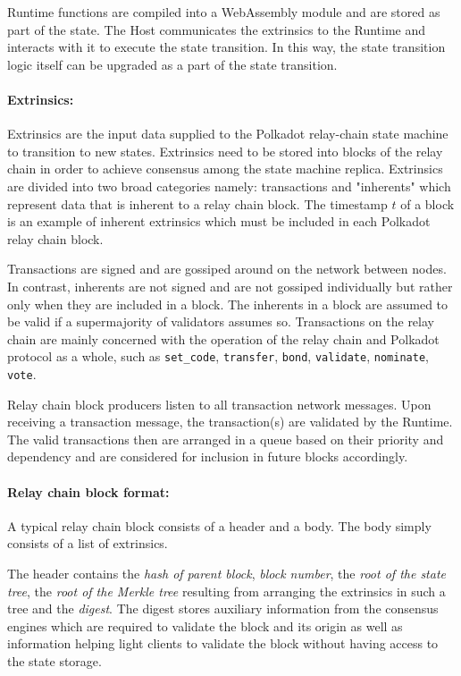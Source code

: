 Runtime functions are compiled into a WebAssembly module and are stored as part of the state. The Host communicates the extrinsics to the Runtime and interacts with it to execute the state transition. In this way, the state transition logic itself can be upgraded as a part of the state transition.

\paragraph{Extrinsics:} \label{par:extrinsics}

Extrinsics are the input data supplied to the Polkadot relay-chain state machine to transition to new states. Extrinsics need to be stored into blocks of the relay chain in order to achieve consensus among the state machine replica. Extrinsics are divided into two broad categories namely: transactions and "inherents" which represent data that is inherent to a relay chain block. The timestamp $t$ of a block is an example of inherent extrinsics which must be included in each Polkadot relay chain block.

Transactions are signed and are gossiped around on the network between nodes. In contrast, inherents are not signed and are not gossiped individually but rather only when they are included in a block. The inherents in a block are assumed to be valid if a supermajority of validators assumes so.  
Transactions on the relay chain are mainly concerned with the operation of the relay chain and Polkadot protocol as a whole, such as \texttt{set\_code}, \texttt{transfer}, \texttt{bond}, \texttt{validate}, \texttt{nominate}, \texttt{vote}.

Relay chain block producers listen to all transaction network messages. Upon receiving a transaction message, the transaction(s) are validated by the Runtime. The valid transactions then are arranged in a queue based on their priority and dependency and are considered for inclusion in future blocks accordingly.

\paragraph{Relay chain block format:}
A typical relay chain block consists of a header and a body. The body simply consists of a list of extrinsics.

The header contains the \textit{hash of parent block}, \textit{block number}, the \textit{root of the state tree}, the \textit{root of the Merkle tree} resulting from arranging the extrinsics in such a tree and the \textit{digest}. The digest stores auxiliary information from the consensus engines which are required to validate the block and its origin as well as information helping light clients to validate the block without having access to the state storage.

